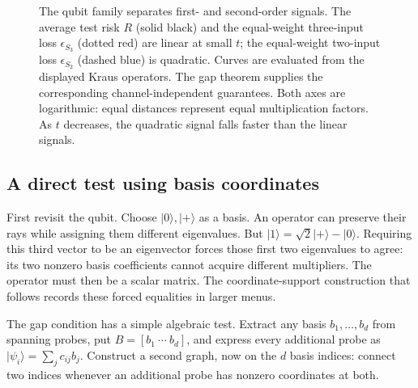 \documentclass[11pt,a4paper]{article}
\newcommand{\ket}[1]{\lvert #1\rangle}
\numberwithin{equation}{section}
\begin{document}
\begin{figure}[tbp]
\centering
{}
\caption{The qubit family separates first- and second-order signals.
The average test risk $R$ (solid black) and the equal-weight three-input
loss $\epsilon_{S_3}$ (dotted red) are linear at small $t$; the equal-weight
two-input loss $\epsilon_{S_2}$ (dashed blue) is quadratic. Curves are
evaluated from the displayed Kraus operators. The gap theorem supplies
the corresponding channel-independent guarantees. Both axes are logarithmic: equal distances represent equal multiplication factors. As $t$ decreases, the quadratic signal falls faster than the linear signals.}
\label{fig:signal}
\end{figure}

\subsection{A direct test using basis coordinates}

First revisit the qubit. Choose $\ket0,\ket+$ as a basis. An operator can
preserve their rays while assigning them different eigenvalues. But
$\ket1=\sqrt2\ket+-\ket0$. Requiring this third vector to be an eigenvector
forces those first two eigenvalues to agree: its two nonzero basis
coefficients cannot acquire different multipliers. The operator must then
be a scalar matrix. The coordinate-support construction that follows records these forced equalities in larger menus.

The gap condition has a simple algebraic test. Extract any basis $b_1,\ldots,b_d$ from spanning probes, put $B=[b_1\ \cdots\ b_d]$, and express every additional probe as $\ket{\psi_i}=\sum_jc_{ij}b_j$. Construct a second graph, now on the $d$ basis indices: connect two indices whenever an additional probe has nonzero coordinates at both.
\end{document}
